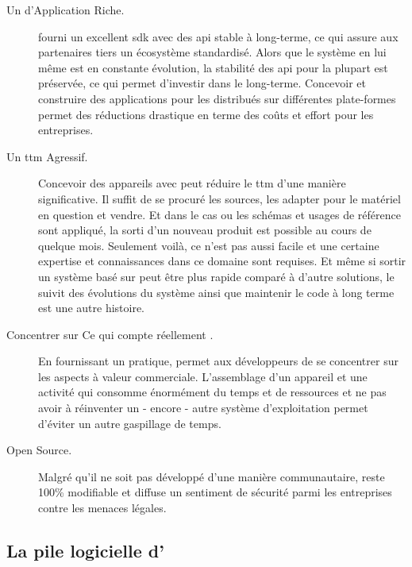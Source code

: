 \begin{description}

\item [Un  d'Application Riche.] \android{} fourni un
excellent \gls{sdk} avec des \gls{api} stable à long-terme, ce qui
assure aux partenaires tiers un écosystème standardisé. Alors que le
système en lui même est en constante évolution, la stabilité des
\gls{api} pour la plupart est préservée, ce qui permet d'investir dans
le long-terme. Concevoir et construire des applications pour les
distribués sur différentes plate-formes permet des réductions drastique en
terme des coûts et effort pour les entreprises.

\item [Un \gls{ttm} Agressif.] Concevoir des appareils avec \android{}
peut réduire le \gls{ttm} d'une manière significative. Il suffit de se
procuré les sources, les adapter pour le matériel en question et vendre. Et dans le cas ou les schémas et usages de référence sont
appliqué, la sorti d'un nouveau produit est possible au cours de quelque
mois. Seulement voilà, ce n'est pas aussi facile et une certaine expertise
et connaissances dans ce domaine sont requises. Et même si sortir un
système basé sur \android{} peut être plus rapide comparé à d'autre
solutions, le suivit des évolutions du système ainsi que maintenir le
code à long terme est une autre histoire.

\item [Concentrer sur \og Ce qui compte réellement \fg.] En fournissant
un  pratique, \android{} permet aux développeurs de se
concentrer sur les aspects à valeur commerciale. L'assemblage d'un
appareil et une activité qui consomme énormément du temps et de
ressources et ne pas avoir à réinventer un - encore - autre système d'exploitation permet d'éviter un autre gaspillage de temps.

\item [Open Source.] Malgré qu'il ne soit pas développé d'une manière
communautaire, \android{} reste 100\% modifiable et diffuse un sentiment
de sécurité parmi les entreprises contre les menaces légales.

\end{description}

\subsection[La pile logicielle d'\android{}]{La pile logicielle d'\android{}\cite{pa4ad:chptr1}}

